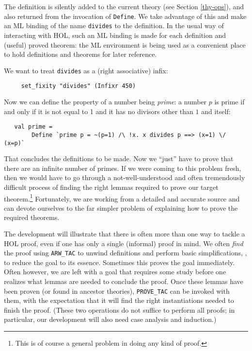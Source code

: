 \documentclass[12pt,fleqn,a4paper]{report}
\begin{document}
The definition is silently added to the current theory (see Section
\ref{thy-ops}), and also returned from the invocation of \verb+Define+. We
take advantage of this and make an ML binding of the name \verb+divides+
to the definition. In the usual way of interacting with HOL, such an ML
binding is made for each definition and (useful) proved theorem: the ML
environment is being used as a convenient place to hold definitions and
theorems for later reference.

We want to treat \verb+divides+ as a (right associative) infix:
{\small\begin{verbatim}
     set_fixity "divides" (Infixr 450)
\end{verbatim}}
Now we can define the property of a number being {\it prime}: a number $p$ is
prime if and only if it is not equal to 1 and it has no divisors other
than $1$ and itself:

{\small\begin{verbatim}
   val prime =
        Define `prime p = ~(p=1) /\ !x. x divides p ==> (x=1) \/ (x=p)`
\end{verbatim}}

That concludes the definitions to be made. Now we ``just'' have to prove
that there are an infinite number of primes. If we were coming to this
problem fresh, then we would have to go through a not-well-understood
and often tremendously difficult process of finding the right lemmas
required to prove our target theorem.\footnote{This is of course a
general problem in doing any kind of proof.} Fortunately, we are working
from a detailed and accurate source and can devote ourselves to the far
simpler problem of explaining how to prove the required theorems.

The development will illustrate that there is often more than one way to
tackle a HOL proof, even if one has only a single (informal) proof in
mind. We often {\it find\/} the proof using \verb+ARW_TAC+ to unwind
definitions and perform basic simplifications, \ie, to reduce the goal
to its essence. Sometimes this proves the goal immediately. Often
however, we are left with a goal that requires some study before one
realizes what lemmas are needed to conclude the proof. Once these lemmas
have been proven (or found in ancestor theories), \verb+PROVE_TAC+ can
be invoked with them, with the expectation that it will find the right
instantiations needed to finish the proof. (These two operations do not
suffice to perform all proofs; in particular, our development will also need
case analysis and induction.)
\end{document}
